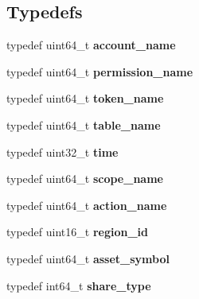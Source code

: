 \subsection*{Typedefs}
\begin{DoxyCompactItemize}
\item 
\mbox{\label{group__types_ga3b44deb4b3b8d6ebab339d1263692117}} 
typedef uint64\+\_\+t {\bfseries account\+\_\+name}
\item 
\mbox{\label{group__types_ga4a16baef1413dc2ec44666f6cc85adb1}} 
typedef uint64\+\_\+t {\bfseries permission\+\_\+name}
\item 
\mbox{\label{group__types_gab67cbd4d66fcef4ed4b5f131f4d59a94}} 
typedef uint64\+\_\+t {\bfseries token\+\_\+name}
\item 
\mbox{\label{group__types_ga330cbf48637c876c57f78d03fd4730bb}} 
typedef uint64\+\_\+t {\bfseries table\+\_\+name}
\item 
\mbox{\label{group__types_ga44479e2657d126b44ca53d30c3e670d8}} 
typedef uint32\+\_\+t {\bfseries time}
\item 
\mbox{\label{group__types_ga38500bd43c27c05b7f8a566cefe94656}} 
typedef uint64\+\_\+t {\bfseries scope\+\_\+name}
\item 
\mbox{\label{group__types_gab0390a1836d20bbbb735af2fce1ad3e8}} 
typedef uint64\+\_\+t {\bfseries action\+\_\+name}
\item 
\mbox{\label{group__types_ga9ff8565896a4a57d1ff8c7c4533a451a}} 
typedef uint16\+\_\+t {\bfseries region\+\_\+id}
\item 
\mbox{\label{group__types_ga020a456ef8f905c10ca9b2a8685b261c}} 
typedef uint64\+\_\+t {\bfseries asset\+\_\+symbol}
\item 
\mbox{\label{group__types_gaa8106cfd71d324f4c43f180bac7d6bc9}} 
typedef int64\+\_\+t {\bfseries share\+\_\+type}
\item 
\mbox{\label{group__types_ga54e6b5cf7b2043097848630225d92bd1}} 

\end{DoxyCompactItemize}
